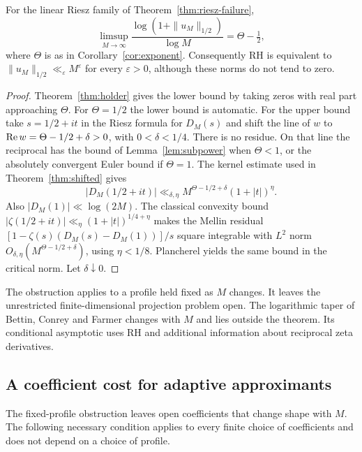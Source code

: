 \begin{corollary}\label{cor:riesz-growth}
For the linear Riesz family of Theorem~\ref{thm:riesz-failure},
\[
 \limsup_{M\to\infty}
   \frac{\log(1+\|u_M\|_{1/2})}{\log M}=\Theta-\tfrac12,
\]
where \(\Theta\) is as in Corollary~\ref{cor:exponent}. Consequently RH is equivalent to \(\|u_M\|_{1/2}\ll_\varepsilon M^\varepsilon\) for every \(\varepsilon>0\), although these norms do not tend to zero.
\end{corollary}
\begin{proof}
Theorem~\ref{thm:holder} gives the lower bound by taking zeros with real part approaching \(\Theta\). For \(\Theta=1/2\) the lower bound is automatic. For the upper bound take \(s=1/2+it\) in the Riesz formula for \(D_M(s)\) and shift the line of \(w\) to \(\operatorname{Re} w=\Theta-1/2+\delta>0\), with \(0<\delta<1/4\). There is no residue. On that line the reciprocal has the bound of Lemma~\ref{lem:subpower} when \(\Theta<1\), or the absolutely convergent Euler bound if \(\Theta=1\). The kernel estimate used in Theorem~\ref{thm:shifted} gives
\[
 |D_M(1/2+it)|\ll_{\delta,\eta}
        M^{\Theta-1/2+\delta}(1+|t|)^\eta .
\]
Also \(|D_M(1)|\ll\log(2M)\). The classical convexity bound \(|\zeta(1/2+it)|\ll_\eta (1+|t|)^{1/4+\eta}\) \cite[Ch.~V]{titchmarsh} makes the Mellin residual
\([1-\zeta(s)(D_M(s)-D_M(1))]/s\)
square integrable with \(L^2\) norm \(O_{\delta,\eta}(M^{\Theta-1/2+\delta})\), using \(\eta<1/8\). Plancherel yields the same bound in the critical norm. Let \(\delta\downarrow0\).
\end{proof}

The obstruction applies to a profile held fixed as \(M\) changes. It leaves the unrestricted finite-dimensional projection problem open. The logarithmic taper of Bettin, Conrey and Farmer \cite{bcf} changes with \(M\) and lies outside the theorem. Its conditional asymptotic uses RH and additional information about reciprocal zeta derivatives.

\subsection{A coefficient cost for adaptive approximants}

The fixed-profile obstruction leaves open coefficients that change shape with \(M\). The following necessary condition applies to every finite choice of coefficients and does not depend on a choice of profile.

